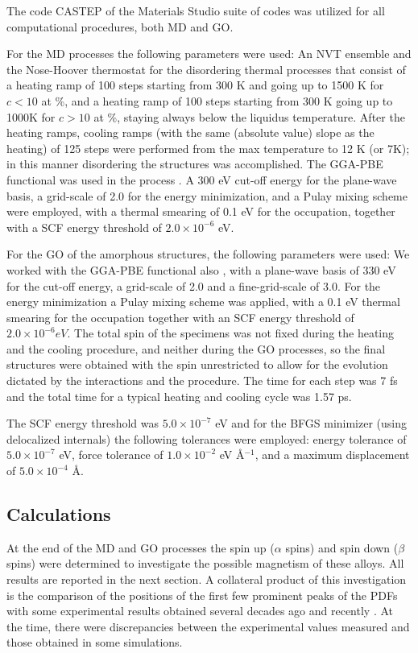 \documentclass[fleqn,12pt]{wlscirep}
\begin{document}
The code CASTEP of the Materials Studio suite of codes was utilized for all computational procedures, both MD and GO.

For the MD processes the following parameters were used: An NVT ensemble and the Nose-Hoover thermostat for the disordering thermal processes that consist of a heating ramp of 100 steps starting from 300 K and going up to 1500 K for $c < 10$ at \%, and a heating ramp of 100 steps starting from 300 K going up to 1000K for $c > 10$ at \%, staying always below the liquidus temperature. After the heating ramps, cooling ramps (with the same (absolute value) slope as the heating) of 125 steps were performed from the max temperature to 12 K (or 7K); in this manner disordering the structures was accomplished. The GGA-PBE functional was used in the process \cite{Perdew_1996}. A 300 eV cut-off energy for the plane-wave basis, a grid-scale of 2.0 for the energy minimization, and a Pulay mixing scheme were employed, with a thermal smearing of 0.1 eV for the occupation, together with a SCF energy threshold of $2.0 \times 10^{-6}$ eV.

For the GO of the amorphous structures, the following parameters were used:  We worked with the GGA-PBE functional also \cite{Perdew_1996}, with a plane-wave basis of 330 eV for the cut-off energy, a grid-scale of 2.0 and a fine-grid-scale of 3.0. For the energy minimization a Pulay mixing scheme was applied, with a 0.1 eV thermal smearing for the occupation together with an SCF energy threshold of $2.0 \times 10^{-6} eV$. The total spin of the specimens was not fixed during the heating and the cooling procedure, and neither during the GO processes, so the final structures were obtained with the spin unrestricted to allow for the evolution dictated by the interactions and the procedure. The time for each step was 7 fs and the total time for a typical heating and cooling cycle was 1.57 ps.

The SCF energy threshold was $5.0 \times 10^{-7}$ eV and for the BFGS minimizer (using delocalized internals) the following tolerances were employed: energy tolerance of $5.0 \times 10^{-7}$ eV, force tolerance of $1.0 \times 10^{-2}$ eV \AA$^{-1}$, and a maximum displacement of $5.0 \times 10^{-4}$ \AA.

\subsection*{Calculations}

At the end of the MD and GO processes the spin up ($\alpha$ spins) and spin down ($\beta$ spins) were determined to investigate the possible magnetism of these alloys. All results are reported in the next section. A collateral product of this investigation is the comparison of the positions of the first few prominent peaks of the PDFs with some experimental results obtained several decades ago \cite{Wong_Guntherodt_book_1981} and recently \cite{Ohkubo_2003}. At the time, there were discrepancies between the experimental values measured and those obtained in some simulations. 
\end{document}
